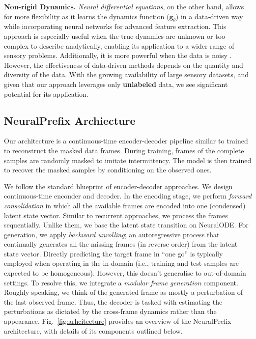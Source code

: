 \documentclass[10pt, conference, compsocconf]{IEEEtran}
\def\update#1{#1}
\begin{document}
 
\update{\textbf{Non-rigid Dynamics.} \textit{Neural differential equations}, on the other hand,  allows for more flexibility as it learns the dynamics function ($\mathbf{g}_\theta$) in a data-driven way while incorporating neural networks for advanced feature extraction. This approach is especially useful when the true dynamics are unknown or too complex to describe analytically, enabling its application to a wider range of sensory problems. Additionally, it is more powerful when the data is noisy \cite{Goyal2023,goyallearning}. However, the effectiveness of data-driven methods depends on the quantity and diversity of the data. With the growing availability of large sensory datasets, and given that our approach leverages only \textbf{unlabeled} data, we see significant potential for its application.  }





\subsection{NeuralPrefix Archiecture}
\label{sec:architecture}






Our architecture is a continuous-time encoder-decoder pipeline similar to \cite{rubanova2019latent} trained to reconstruct the masked data frames. During training, frames of the complete samples are randomly masked to imitate intermittency. The model is then trained to recover the masked samples by conditioning on the observed ones.

We follow the standard blueprint of  encoder-decoder approaches. We design continuous-time \update{enconder} and decoder. In the encoding \update{stage,} we perform \textit{forward consolidation} in which all the available frames are encoded into one (condensed) latent state vector. Similar to recurrent \update{approaches,} we process the frames sequentially. Unlike them, we base the latent state transition on NeuralODE.
For generation, we apply \textit{ backward unrolling}; an autoregressive process that continually generates all the missing \update{frames} (in reverse order) from the latent state vector. Directly predicting the target frame in ``one go'' is typically employed when operating in the in-domain (i.e., training and test samples are expected to be homogeneous).  However, this doesn't generalise to out-of-domain settings.  To resolve this, we integrate a \textit{modular frame generation} component. Roughly speaking, we think of the generated frame as mostly a perturbation of the last observed frame. Thus, the decoder is tasked with estimating the perturbations as dictated by the cross-frame dynamics rather than the appearance. Fig.~\ref{fig:arhcitecture} provides an overview of the NeuralPrefix architecture, with details of its components outlined below. 
\end{document}
